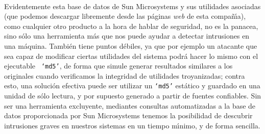 \\Evidentemente esta base de datos de Sun Microsystems y sus utilidades 
asociadas (que podemos descargar libremente desde las p\'aginas {\it web} de
esta compa\~n\'{\i}a), como cualquier otro producto a la hora
de hablar de seguridad, no es la panacea, sino s\'olo una herramienta m\'as que
nos puede ayudar a detectar intrusiones en una m\'aquina. Tambi\'en tiene
puntos d\'ebiles, ya que por ejemplo un atacante que sea capaz de modificar
ciertas utilidades del sistema podr\'a hacer lo mismo con el ejecutable {\tt
`md5'}, de forma que simule generar resultados similares a los originales 
cuando verificamos la integridad de utilidades troyanizadas; contra esto, una
soluci\'on efectiva puede ser utilizar un {\tt `md5'} est\'atico y guardado en
una unidad de s\'olo lectura, y por supuesto generado a partir de fuentes
confiables. Sin ser una herramienta excluyente, mediantes consultas 
automatizadas a la base de datos proporcionada por Sun Microsystems tenemos la
posibilidad de descubrir intrusiones graves en nuestros sistemas en un tiempo
m\'{\i}nimo, y de forma sencilla.
